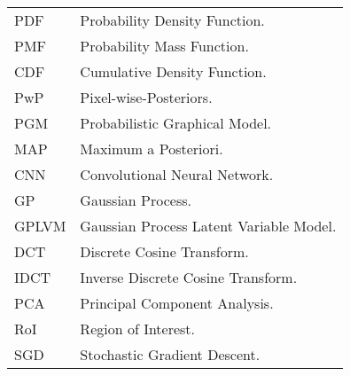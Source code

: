 \begin{longtable}{p{} | p{}}
  PDF & Probability Density Function.\\
  PMF & Probability Mass Function.\\
  CDF & Cumulative Density Function.\\
  PwP & Pixel-wise-Posteriors.\\
  PGM & Probabilistic Graphical Model.\\
  MAP & Maximum a Posteriori.\\
  CNN & Convolutional Neural Network.\\
  GP & Gaussian Process.\\
  GPLVM & Gaussian Process Latent Variable Model.\\
  DCT & Discrete Cosine Transform.\\
  IDCT & Inverse Discrete Cosine Transform.\\
  PCA & Principal Component Analysis. \\
  RoI & Region of Interest. \\
  SGD & Stochastic Gradient Descent.
~\label{table:abbreviations}
\end{longtable}